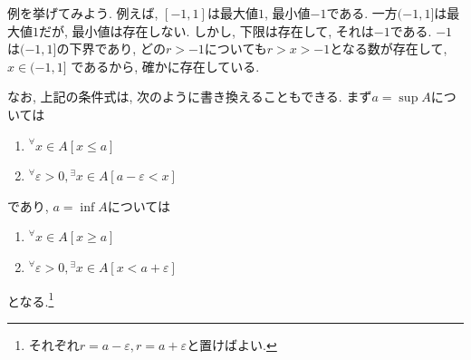 \documentclass[a4j,dvipdfmx]{jsarticle}
\numberwithin{equation}{section}
\begin{document}
            例を挙げてみよう. 例えば, $[-1,1]$は最大値$1$, 最小値$-1$である. 一方$(-1,1]$は最大値$1$だが, 最小値は存在しない.
            しかし, 下限は存在して, それは$-1$である. $-1$は$(-1,1]$の下界であり, どの$r>-1$についても$r>x>-1$となる数が存在して, $x\in (-1,1]$
            であるから, 確かに存在している.

            なお, 上記の条件式は, 次のように書き換えることもできる. まず$a=\sup A$については
            \begin{enumerate}
                \item $^\forall x\in A \left[x\leq a\right]$
                \item $^\forall \varepsilon>0,{}^\exists x\in A \left[a-\varepsilon < x\right]$
            \end{enumerate}
            であり, $a=\inf A$については
            \begin{enumerate}
                \item $^\forall x\in A \left[x\geq a\right]$
                \item $^\forall \varepsilon>0,{}^\exists x\in A \left[x < a+\varepsilon\right]$
            \end{enumerate}
            となる.\footnote{それぞれ$r=a-\varepsilon,r=a+\varepsilon$と置けばよい.}
\end{document}
